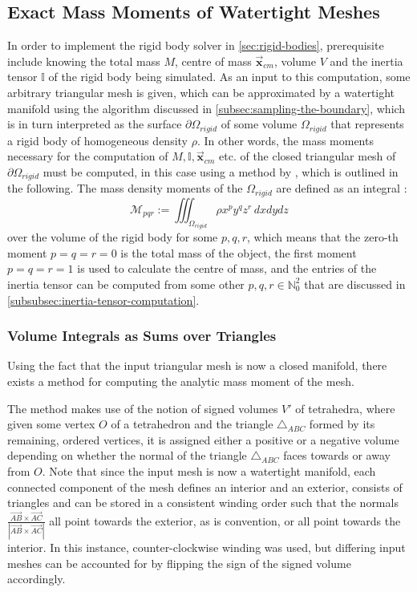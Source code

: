 \documentclass[oneside, a4paper]{book}
\newcommand\abs[1]{\left|#1\right|}
\newcommand\vek[1]{\vec{\bm{#1}}}
\begin{document}
  \subsection{Exact Mass Moments of Watertight Meshes}\label{sec:mass-moments}
  In order to implement the rigid body solver in \autoref{sec:rigid-bodies}, prerequisite include knowing the total mass $M$, centre of mass $\vek{x}_{cm}$, volume $V$ and the inertia tensor $\mathds{I}$ of the rigid body being simulated. As an input to this computation, some arbitrary triangular mesh is given, which can be approximated by a watertight manifold using the algorithm discussed in \autoref{subsec:sampling-the-boundary}, which is in turn interpreted as the surface $\partial\Omega_{rigid}$ of some volume $\Omega_{rigid}$ that represents a rigid body of homogeneous density $\rho$. In other words, the mass moments necessary for the computation of $M,\mathds{I},\vek{x}_{cm}$ etc. of the closed triangular mesh of $\partial\Omega_{rigid}$ must be computed, in this case using a method by \autocite[Zhang and Chen]{efficient-feature-extraction}, which is outlined in the following. The mass density moments of the $\Omega_{rigid}$ are defined as an integral \autocite{efficient-feature-extraction}:
  \begin{equation}\label{eq:mass-density-moments}
    \mathcal{M}_{pqr} := \iiint_{\Omega_{rigid}} \rho x^p y^q z^r  \, dxdydz
  \end{equation}
  over the volume of the rigid body for some $p,q,r$, which means that the zero-th moment $p=q=r=0$ is the total mass of the object, the first moment $p=q=r=1$ is used to calculate the centre of mass, and the entries of the inertia tensor can be computed from some other $p,q,r \in \mathds{N}_0^2$ that are discussed in \autoref{subsubsec:inertia-tensor-computation}.

  \subsubsection{Volume Integrals as Sums over Triangles}
  
  Using the fact that the input triangular mesh is now a closed manifold, there exists a method for computing the analytic mass moment of the mesh. 
  
  The method makes use of the notion of signed volumes $V'$ of tetrahedra, where given some vertex $O$ of a tetrahedron and the triangle $\triangle_{ABC}$ formed by its remaining, ordered vertices, it is assigned either a positive or a negative volume depending on whether the normal of the triangle $\triangle_{ABC}$ faces towards or away from $O$. Note that since the input mesh is now a watertight manifold, each connected component of the mesh defines an interior and an exterior, consists of triangles and can be stored in a consistent winding order such that the normals $\frac{\overrightarrow{AB} \times \overrightarrow{AC}}{\abs{\overrightarrow{AB} \times \overrightarrow{AC}}}$ all point towards the exterior, as is convention, or all point towards the interior. In this instance, counter-clockwise winding was used, but differing input meshes can be accounted for by flipping the sign of the signed volume accordingly.
  
\end{document}
